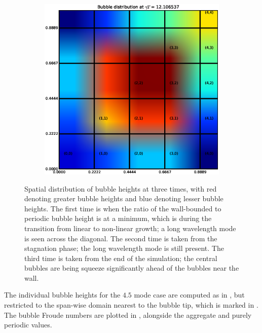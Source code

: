 \begin{figure}
\begin{subfigure}[b]{0.49\textwidth}
\end{subfigure}
\begin{subfigure}[b]{0.49\textwidth}
  \includegraphics[width=\textwidth]{figs/spatial_bubble-59}
\end{subfigure}
\caption{ 
Spatial distribution of bubble heights at three times, with red denoting greater bubble heights and blue denoting lesser bubble heights.
The first time is when the ratio of the wall-bounded to periodic bubble height is at a minimum, which is during the transition from linear to non-linear growth; a long wavelength mode is seen across the diagonal.
The second time is taken from the stagnation phase; the long wavelength mode is still present.
The third time is taken from the end of the simulation; the central bubbles are being squeeze significantly ahead of the bubbles near the wall.
}
\end{figure}

The individual bubble heights for the $4.5$ mode case are computed as in , but restricted to the span-wise domain nearest to the bubble tip, which is marked in .
The bubble Froude numbers are plotted in , alongside the aggregate and purely periodic values.

